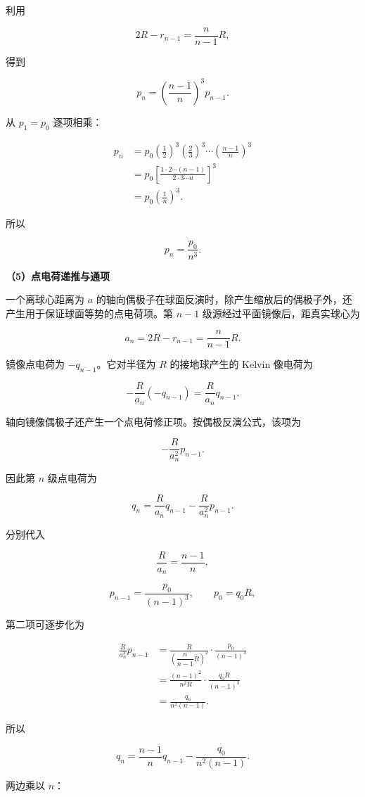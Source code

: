 \documentclass[12pt,a4paper,UTF8]{ctexart}
\begin{document}
利用

\[2R-r_{n-1}=\frac{n}{n-1}R,\]

得到

\[p_n=\left(\frac{n-1}{n}\right)^3p_{n-1}.\]

从 \(p_1=p_0\) 逐项相乘：

\[\begin{aligned}
p_n
&=p_0
\left(\frac12\right)^3
\left(\frac23\right)^3
\cdots
\left(\frac{n-1}{n}\right)^3\\
&=p_0
\left[
\frac{1\cdot2\cdots(n-1)}
{2\cdot3\cdots n}
\right]^3\\
&=p_0\left(\frac1n\right)^3.
\end{aligned}\]

所以

\[\boxed{p_n=\frac{p_0}{n^3}}.\]

\textbf{（5）点电荷递推与通项}

一个离球心距离为 \(a\)
的轴向偶极子在球面反演时，除产生缩放后的偶极子外，还产生用于保证球面等势的点电荷项。第
\(n-1\) 级源经过平面镜像后，距真实球心为

\[a_n=2R-r_{n-1}
=\frac{n}{n-1}R.\]

镜像点电荷为 \(-q_{n-1}\)。它对半径为 \(R\) 的接地球产生的 Kelvin
像电荷为

\[-\frac{R}{a_n}(-q_{n-1})
=\frac{R}{a_n}q_{n-1}.\]

轴向镜像偶极子还产生一个点电荷修正项。按偶极反演公式，该项为

\[-\frac{R}{a_n^2}p_{n-1}.\]

因此第 \(n\) 级点电荷为

\[q_n
=\frac{R}{a_n}q_{n-1}
-\frac{R}{a_n^2}p_{n-1}.\]

分别代入

\[\frac{R}{a_n}=\frac{n-1}{n},\]

\[p_{n-1}=\frac{p_0}{(n-1)^3},\qquad
p_0=q_0R,\]

第二项可逐步化为

\[\begin{aligned}
\frac{R}{a_n^2}p_{n-1}
&=
\frac{R}{
\left(\dfrac{n}{n-1}R\right)^2
}
\cdot\frac{p_0}{(n-1)^3}\\
&=
\frac{(n-1)^2}{n^2R}
\cdot\frac{q_0R}{(n-1)^3}\\
&=\frac{q_0}{n^2(n-1)}.
\end{aligned}\]

所以

\[q_n
=\frac{n-1}{n}q_{n-1}
-\frac{q_0}{n^2(n-1)}.\]

两边乘以 \(n\)：
\end{document}
